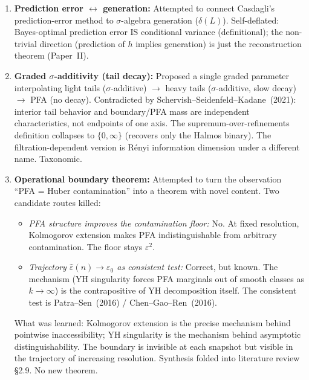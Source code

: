 \begin{enumerate}
  \item \textbf{Prediction error $\leftrightarrow$ generation:}
    Attempted to connect Casdagli's prediction-error method to
    $\sigma$-algebra generation ($\delta(L)$).  Self-deflated:
    Bayes-optimal prediction error IS conditional variance
    (definitional); the non-trivial direction (prediction of $h$
    implies generation) is just the reconstruction theorem
    (Paper~II).

  \item \textbf{Graded $\sigma$-additivity (tail decay):}
    Proposed a single graded parameter interpolating light tails
    ($\sigma$-additive) $\to$ heavy tails ($\sigma$-additive, slow
    decay) $\to$ PFA (no decay).
    Contradicted by Schervish--Seidenfeld--Kadane~(2021): interior
    tail behavior and boundary/PFA mass are independent
    characteristics, not endpoints of one axis.  The
    supremum-over-refinements definition collapses to
    $\{0,\infty\}$ (recovers only the Halmos binary).  The
    filtration-dependent version is R\'{e}nyi information dimension
    under a different name.  Taxonomic.

  \item \textbf{Operational boundary theorem:}
    Attempted to turn the observation ``PFA = Huber contamination''
    into a theorem with novel content.  Two candidate routes killed:
    \begin{itemize}[nosep]
      \item \emph{PFA structure improves the contamination floor:}
        No.  At fixed resolution, Kolmogorov extension makes PFA
        indistinguishable from arbitrary contamination.  The floor
        stays $\varepsilon^2$.
      \item \emph{Trajectory $\hat\varepsilon(n) \to \varepsilon_0$
        as consistent test:} Correct, but known.  The mechanism
        (YH singularity forces PFA marginals out of smooth classes
        as $k\to\infty$) is the contrapositive of YH decomposition
        itself.  The consistent test is Patra--Sen~(2016) /
        Chen--Gao--Ren~(2016).
    \end{itemize}
    What was learned: Kolmogorov extension is the precise mechanism
    behind pointwise inaccessibility; YH singularity is the
    mechanism behind asymptotic distinguishability.  The boundary is
    invisible at each snapshot but visible in the trajectory of
    increasing resolution.  Synthesis folded into literature review
    \S2.9.  No new theorem.


\end{enumerate}
